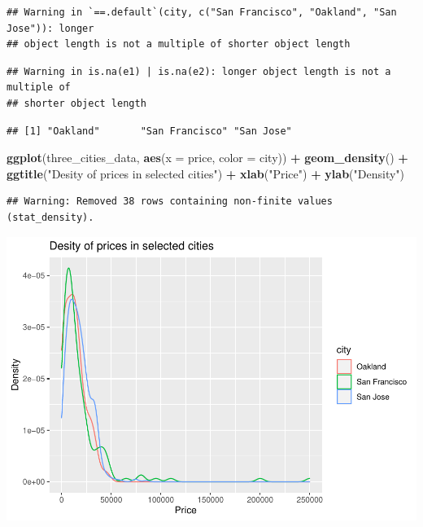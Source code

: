 \documentclass[
]{article}
\newenvironment{Shaded}{\begin{snugshade}}{\end{snugshade}}
\newcommand{\DataTypeTok}[1]{\textcolor[rgb]{0.13,0.29,0.53}{#1}}
\newcommand{\KeywordTok}[1]{\textcolor[rgb]{0.13,0.29,0.53}{\textbf{#1}}}
\newcommand{\NormalTok}[1]{#1}
\newcommand{\OperatorTok}[1]{\textcolor[rgb]{0.81,0.36,0.00}{\textbf{#1}}}
\newcommand{\StringTok}[1]{\textcolor[rgb]{0.31,0.60,0.02}{#1}}
\begin{document}
\begin{verbatim}
## Warning in `==.default`(city, c("San Francisco", "Oakland", "San Jose")): longer
## object length is not a multiple of shorter object length
\end{verbatim}

\begin{verbatim}
## Warning in is.na(e1) | is.na(e2): longer object length is not a multiple of
## shorter object length
\end{verbatim}

\begin{Shaded}
\end{Shaded}

\begin{verbatim}
## [1] "Oakland"       "San Francisco" "San Jose"
\end{verbatim}

\begin{Shaded}
\begin{Highlighting}[]
\KeywordTok{ggplot}\NormalTok{(three\_cities\_data, }\KeywordTok{aes}\NormalTok{(}\DataTypeTok{x =}\NormalTok{ price, }\DataTypeTok{color =}\NormalTok{ city)) }\OperatorTok{+}\StringTok{ }\KeywordTok{geom\_density}\NormalTok{() }\OperatorTok{+}
\KeywordTok{ggtitle}\NormalTok{(}\StringTok{"Desity of prices in selected cities"}\NormalTok{) }\OperatorTok{+}\StringTok{ }\KeywordTok{xlab}\NormalTok{(}\StringTok{"Price"}\NormalTok{) }\OperatorTok{+}\StringTok{ }\KeywordTok{ylab}\NormalTok{(}\StringTok{"Density"}\NormalTok{)}
\end{Highlighting}
\end{Shaded}

\begin{verbatim}
## Warning: Removed 38 rows containing non-finite values (stat_density).
\end{verbatim}

\includegraphics{hw3_files/figure-latex/unnamed-chunk-10-1.pdf}
\end{document}
